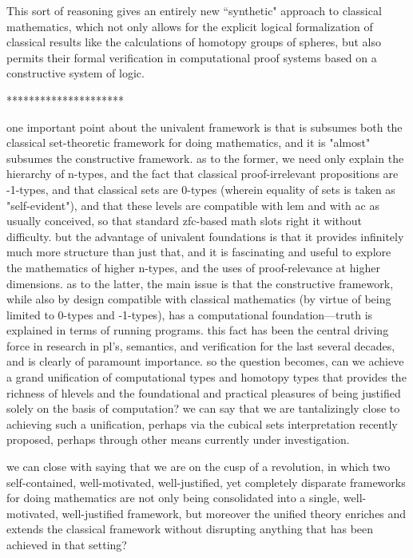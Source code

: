 \documentclass[11pt]{article}
\theoremstyle{remark}
\theoremstyle{definition}
\begin{document}
This sort of reasoning gives an entirely new ``synthetic" approach to classical mathematics, which not only allows for the explicit logical formalization of classical results like the calculations of homotopy groups of spheres, but also permits their formal verification in computational proof systems based on a constructive system of logic.

*********************

one important point about the univalent framework is that is subsumes both the classical set-theoretic framework for doing mathematics, and it is "almost" subsumes the constructive framework.  as to the former, we need only explain the hierarchy of n-types, and the fact that classical proof-irrelevant propositions are -1-types, and that classical sets are 0-types (wherein equality of sets is taken as "self-evident"), and that these levels are compatible with lem and with ac as usually conceived, so that standard zfc-based math slots right it without difficulty.  but the advantage of univalent foundations is that it provides infinitely much more structure than just that, and it is fascinating and useful to explore the mathematics of higher n-types, and the uses of proof-relevance at higher dimensions.  as to the latter, the main issue is that the constructive framework, while also by design compatible with classical mathematics (by virtue of being limited to 0-types and -1-types), has a computational foundation---truth is explained in terms of running programs.  this fact has been the central driving force in research in pl's, semantics, and verification for the last several decades, and is clearly of paramount importance.  so the question becomes, can we achieve a grand unification of computational types and homotopy types that provides the richness of hlevels and the foundational and practical pleasures of being justified solely on the basis of computation?  we can say that we are tantalizingly close to achieving such a unification, perhaps via the cubical sets interpretation recently proposed, perhaps through other means currently under investigation.

we can close with saying that we are on the cusp of a revolution, in which two self-contained, well-motivated, well-justified, yet completely disparate frameworks for doing mathematics are not only being consolidated into a single, well-motivated, well-justified framework, but moreover the unified theory enriches and extends the classical framework without disrupting anything that has been achieved in that setting?
\end{document}
